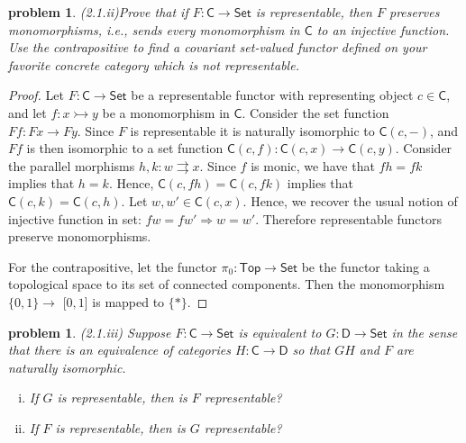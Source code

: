 \documentclass[10pt, oneside]{article}   	%
\newcommand{\cat}[1]{\mathsf{#1}}
\newcommand{\cc}{\cat{C}}
\newcommand{\dd}{\cat{D}}
\newcommand{\cset}{\cat{Set}}
\newcommand{\mono}{\rightarrowtail}
\newtheorem{problem}[theorem]{problem}
\begin{document}
\begin{problem}{(2.1.ii)}Prove that if $F : \cc \to \cset$ is representable, then $F$ preserves monomorphisms, i.e., sends every monomorphism in $\cc$ to an injective function. Use the contrapositive to find a covariant set-valued functor defined on your favorite concrete category which is not representable. 
\end{problem}

\begin{proof}
 
 Let $F : \cc \to \cset$ be a representable functor with representing object $c \in \cc$, and let $f : x \mono y$ be a monomorphism in $\cc$. Consider the set function $Ff : Fx \to Fy$. Since $F$ is representable it is naturally isomorphic to $\cc(c, -)$, and $Ff$ is then isomorphic to a set function $\cc(c,f) : \cc(c, x) \to \cc(c, y)$. Consider the parallel morphisms $h, k : w \rightrightarrows x$. Since $f$ is monic, we have that $fh = fk$ implies that $h = k$. Hence, $\cc(c, fh) = \cc(c, fk)$ implies that  $\cc(c, k) = \cc(c, h)$. Let $w, w'\in \cc(c, x)$. Hence, we recover the usual notion of injective function in set: $f w = f w' \Rightarrow w = w'$. Therefore representable functors preserve monomorphisms.
 
 For the contrapositive, let the functor $\pi_0 : \cat{Top} \to \cset$ be the functor taking a topological space to its set of connected components. Then the monomorphism $\{0, 1\} \to $ [$0,1$] is mapped to $\{*\}$.
\end{proof}

\begin{problem} (2.1.iii) Suppose $F: \cc \to \cset$ is equivalent to $G: \dd \to \cset$ in the sense that there is an equivalence of categories $H: \cc \to \dd$ so that $GH$ and $F$ are naturally isomorphic. 

\begin{enumerate}[(i)]
	\item If $G$ is representable, then is $F$ representable?
	\item If $F$ is representable, then is $G$ representable?
\end{enumerate}
\end{problem}
\end{document}
